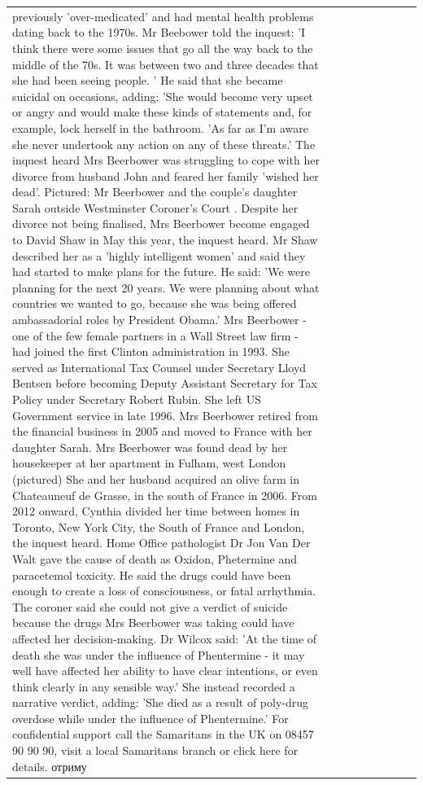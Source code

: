 \begin{table}[H]
\begin{tabular}{lllrlllll}
previously 'over-medicated' and had mental health problems dating back to the 1970s. Mr Beebower told the inquest: 'I think there were some issues that go all the way back to the middle of the 70s. It was between two and three decades that she had been seeing people. ' He said that she became suicidal on occasions, adding: 'She would become very upset or angry and would make these kinds of statements and, for example, lock herself in the bathroom. 'As far as I'm aware she never undertook any action on any of these threats.' The inquest heard Mrs Beerbower was struggling to cope with her divorce from husband John and feared her family 'wished her dead'. Pictured: Mr Beerbower and the couple's daughter Sarah outside Westminster Coroner's Court . Despite her divorce not being finalised, Mrs Beerbower become engaged to David Shaw in May this year, the inquest heard. Mr Shaw described her as a 'highly intelligent women' and said they had started to make plans for the future. He said: 'We were planning for the next 20 years. We were planning about what countries we wanted to go, because she was being offered ambassadorial roles by President Obama.' Mrs Beerbower - one of the few female partners in a Wall Street law firm - had joined the first Clinton administration in 1993. She served as International Tax Counsel under Secretary Lloyd Bentsen before becoming Deputy Assistant Secretary for Tax Policy under Secretary Robert Rubin. She left US Government service in late 1996. Mrs Beerbower retired from the financial business in 2005 and moved to France with her daughter Sarah. Mrs Beerbower was found dead by her housekeeper at her apartment in Fulham, west London (pictured) She and her husband acquired an olive farm in Chateauneuf de Grasse, in the south of France in 2006. From 2012 onward, Cynthia divided her time between homes in Toronto, New York City, the South of France and London, the inquest heard. Home Office pathologist Dr Jon Van Der Walt gave the cause of death as Oxidon, Phetermine and paracetemol toxicity. He said the drugs could have been enough to create a loss of consciousness, or fatal arrhythmia. The coroner said she could not give a verdict of suicide because the drugs Mrs Beerbower was taking could have affected her decision-making. Dr Wilcox said: 'At the time of death she was under the influence of Phentermine - it may well have affected her ability to have clear intentions, or even think clearly in any sensible way.' She instead recorded a narrative verdict, adding: 'She died as a result of poly-drug overdose while under the influence of Phentermine.' For confidential support call the Samaritans in the UK on 08457 90 90 90, visit a local Samaritans branch or click here for details. отриму \\

\end{tabular}
\end{table}
